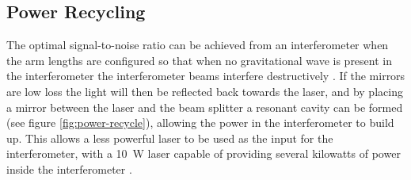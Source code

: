 \documentclass{kentigern}
\begin{document}
\subsection{Power Recycling}
\label{sec:power-recycling}
%
%
The optimal signal-to-noise ratio can be achieved from an
interferometer when the arm lengths are configured so that when no
gravitational wave is present in the interferometer the interferometer
beams interfere destructively \cite{1978JPhE...11..710E}. If the
mirrors are low loss the light will then be reflected back towards the
laser, and by placing a mirror between the laser and the beam splitter
a resonant cavity can be formed (see figure \ref{fig:power-recycle}),
allowing the power in the interferometer to build up. This allows a
less powerful laser to be used as the input for the interferometer,
with a \SI{10}{\watt} laser capable of providing several kilowatts of
power inside the interferometer \cite{2011LRR....14....5P}.
\end{document}
